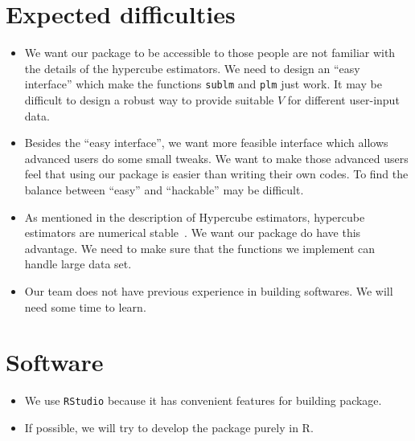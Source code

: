 \documentclass[draft]{article}
\begin{document}
\section{Expected difficulties}
\begin{itemize}

	\item We want our package to be accessible to those people are not familiar with the details of the hypercube estimators. We need to design an ``easy interface'' which make the functions {\tt sublm} and {\tt plm} just work. It may be difficult to design a robust way to provide suitable $V$ for different user-input data.

	\item Besides the ``easy interface'', we want more feasible interface which allows advanced users do some small tweaks. We want to make those advanced users feel that using our package is easier than writing their own codes. To find the balance between ``easy'' and ``hackable'' may be difficult.

	\item As mentioned in the description of Hypercube estimators, hypercube estimators are numerical stable~\cite{beran2014hypercube}. We want our package do have this advantage. We need to make sure that the functions we implement can handle large data set.

	\item Our team does not have previous experience in building softwares. We will need some time to learn.

\end{itemize}


\section{Software}
\begin{itemize}
	\item We use \texttt{RStudio} because it has convenient features for building package. 
	\item If possible, we will try to develop the package purely in R. 
\end{itemize}






 
\end{document}
